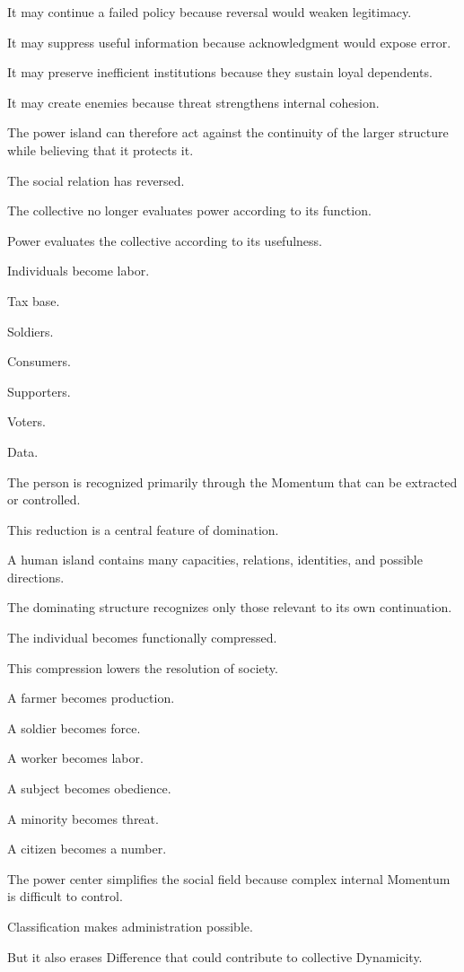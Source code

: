 It may continue a failed policy because reversal would weaken legitimacy.

It may suppress useful information because acknowledgment would expose error.

It may preserve inefficient institutions because they sustain loyal dependents.

It may create enemies because threat strengthens internal cohesion.

The power island can therefore act against the continuity of the larger structure while believing that it protects it.

The social relation has reversed.

The collective no longer evaluates power according to its function.

Power evaluates the collective according to its usefulness.

Individuals become labor.

Tax base.

Soldiers.

Consumers.

Supporters.

Voters.

Data.

The person is recognized primarily through the Momentum that can be extracted or controlled.

This reduction is a central feature of domination.

A human island contains many capacities, relations, identities, and possible directions.

The dominating structure recognizes only those relevant to its own continuation.

The individual becomes functionally compressed.

This compression lowers the resolution of society.

A farmer becomes production.

A soldier becomes force.

A worker becomes labor.

A subject becomes obedience.

A minority becomes threat.

A citizen becomes a number.

The power center simplifies the social field because complex internal Momentum is difficult to control.

Classification makes administration possible.

But it also erases Difference that could contribute to collective Dynamicity.

